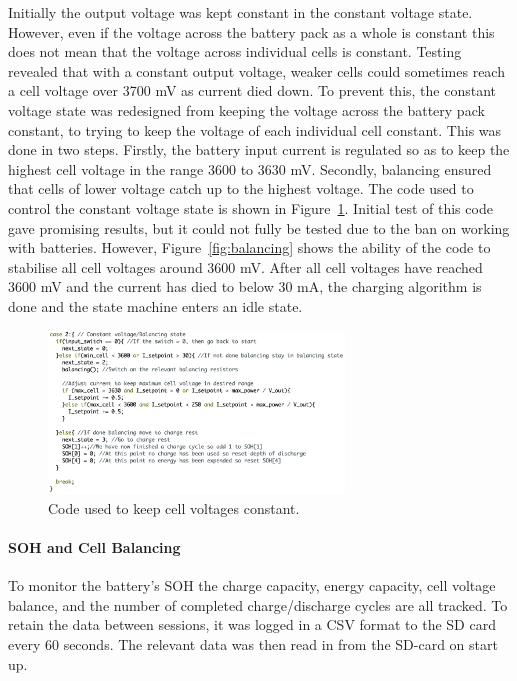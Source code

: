 \documentclass[a4paper]{article}
\begin{document}
Initially the output voltage was kept constant in the constant voltage 
state. However, even if the voltage across the battery pack as a whole is 
constant this does not mean that the voltage across individual cells is constant. 
Testing revealed that with a constant output voltage, weaker cells could sometimes 
reach a cell voltage over 3700 mV as current died down. To prevent this, the 
constant voltage state was redesigned from keeping the voltage across the battery 
pack constant, to trying to keep the voltage of each individual cell constant. 
This was done in two steps. Firstly, the battery input current is regulated so 
as to keep the highest cell voltage in the range 3600 to 3630 mV. Secondly, 
balancing ensured that cells of lower voltage catch up to the highest voltage. 
The code used to control the constant voltage state is shown in 
Figure~\ref{fig:Constant_Voltage}. Initial test of this code gave promising 
results, but it could not fully be tested due to the ban on working with 
batteries. However, Figure~\ref{fig:balancing} shows the ability of the code 
to stabilise all cell voltages around 3600 mV. After all cell voltages have 
reached 3600 mV and the current has died to below 30 mA, the charging algorithm 
is done and the state machine enters an idle state. 

\begin{figure}[H]
    \centering
    \includegraphics[width = 0.7\textwidth]{Constant_voltage.png}
    \caption{Code used to keep cell voltages constant.}
    \vspace{-10pt}
    \label{fig:Constant_Voltage}
\end{figure}

\paragraph*{SOH and Cell Balancing}
To monitor the battery’s SOH the charge capacity, energy capacity, 
cell voltage balance, and the number of completed charge/discharge 
cycles are all tracked. To retain the data between sessions, it was 
logged in a CSV format to the SD card every 60 seconds. The relevant data 
was then read in from the SD-card on start up.
\end{document}

